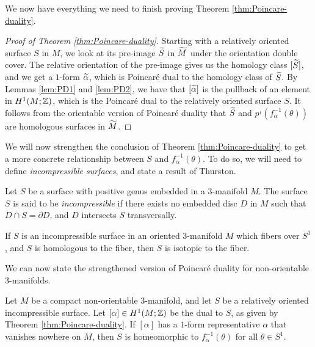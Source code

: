 We now have everything we need to finish proving Theorem \ref{thm:Poincare-duality}.
\begin{proof}[Proof of Theorem \ref{thm:Poincare-duality}]
  Starting with a relatively oriented surface $S$ in $M$, we look at its pre-image $\widetilde{S}$ in $\widetilde{M}$ under the orientation double cover.
  The relative orientation of the pre-image gives us the homology class $[\widetilde{S}]$, and we get a $1$-form $\widetilde{\alpha}$, which is Poincar\'e dual to the homology class of $\widetilde{S}$.
  By Lemmas \ref{lem:PD1} and \ref{lem:PD2}, we have that $[\widetilde{\alpha}]$ is the pullback of an element in $H^1(M; \mathbb{Z})$, which is the Poincar\'e dual to the relatively oriented surface $S$.
  It follows from the orientable version of Poincar\'e duality that $\widetilde{S}$ and $p^{_1}(f_{\alpha}^{-1}(\theta))$ are homologous surfaces in $\widetilde{M}$.
\end{proof}

We will now strengthen the conclusion of Theorem \ref{thm:Poincare-duality} to get a more concrete relationship between $S$ and $f_{\alpha}^{-1}(\theta)$.
To do so, we will need to define \emph{incompressible surfaces}, and state a result of Thurston.

\begin{defn}
  Let $S$ be a surface with positive genus embedded in a $3$-manifold $M$.
  The surface $S$ is said to be \emph{incompressible} if there exists no embedded disc $D$ in $M$ such that $D \cap S = \partial D$, and $D$ intersects $S$ transversally.
\end{defn}
\begin{thm}
  \label{thm:Thur2}
If $S$ is an incompressible surface in an oriented $3$-manifold $M$ which fibers over $S^1$, and $S$ is homologous to the fiber, then $S$ is isotopic to the fiber.
\end{thm}

We can now state the strengthened version of Poincar\'e duality for non-orientable $3$-manifolds.
\begin{thm}
  \label{thm:strong-duality}
  Let $M$ be a compact non-orientable $3$-manifold, and let $S$ be a relatively oriented incompressible surface.
  Let $[\alpha] \in H^1(M; \mathbb{Z})$ be the dual to $S$, as given by Theorem \ref{thm:Poincare-duality}.
  If $[\alpha]$ has a $1$-form representative $\alpha$ that vanishes nowhere on $M$, then $S$ is homeomorphic to $f_{\alpha}^{-1}(\theta)$ for all $\theta \in S^1$.
\end{thm}

